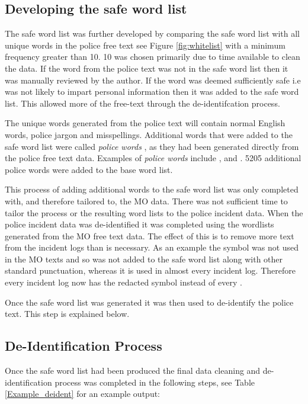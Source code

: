 \subsection{Developing the safe word list} The safe word list was further developed by comparing the safe word list with all unique words in the police free text see Figure \ref{fig:whitelist} with a minimum frequency greater than 10. 10 was chosen primarily due to time available to clean the data. If the word from the police text was not in the safe word list then it was manually reviewed by the author.  If the word was deemed sufficiently safe i.e was not likely to impart personal information then it was added to the safe word list.  This allowed more of the free-text through the de-identifcation process.

The unique words generated from the police text will contain normal English words, police jargon and misspellings. Additional words that were added to the safe word list were called \emph{police words} , as they had been generated directly from the police free text data. Examples of \emph{police words}  include ,  and . 5205 additional police words were added to the base word list.

This process of adding additional words to the safe word list was only completed with, and therefore tailored to, the MO data. There was not sufficient time to tailor the process or the resulting word lists to the police incident data. When the police incident data was de-identified it was completed using the wordlists generated from the MO free text data. The effect of this is to remove more text from the incident logs than is necessary. As an example the \say{:} symbol was not used in the MO texts and so was not added to the safe word list along with other standard punctuation, whereas it is used in almost every incident log. Therefore every incident log now has the redacted symbol  instead of every \say{:}.

Once the safe word list was generated it was then used to de-identify the police text. This step is explained below.


\subsection{De-Identification Process} Once the safe word list had been produced the final data cleaning and de-identification process was completed in the following steps, see Table \ref{Example_deident} for an example output:

